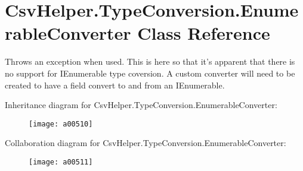 \hypertarget{a00095}{\section{Csv\-Helper.\-Type\-Conversion.\-Enumerable\-Converter Class Reference}
\label{a00095}
}


Throws an exception when used. This is here so that it's apparent that there is no support for I\-Enumerable type coversion. A custom converter will need to be created to have a field convert to and from an I\-Enumerable.  




Inheritance diagram for Csv\-Helper.\-Type\-Conversion.\-Enumerable\-Converter\-:
\nopagebreak
\begin{figure}[H]
\begin{center}
\leavevmode
\texttt{[image: a00510]}
\end{center}
\end{figure}


Collaboration diagram for Csv\-Helper.\-Type\-Conversion.\-Enumerable\-Converter\-:
\nopagebreak
\begin{figure}[H]
\begin{center}
\leavevmode
\texttt{[image: a00511]}
\end{center}
\end{figure}
